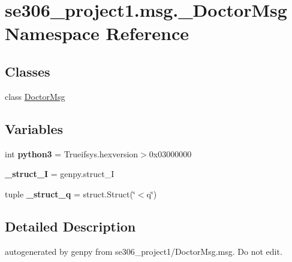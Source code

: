 \hypertarget{namespacese306__project1_1_1msg_1_1__DoctorMsg}{\section{se306\-\_\-project1.\-msg.\-\_\-\-Doctor\-Msg Namespace Reference}
\label{namespacese306__project1_1_1msg_1_1__DoctorMsg}
}
\subsection*{Classes}
\begin{DoxyCompactItemize}
\item 
class \hyperlink{classse306__project1_1_1msg_1_1__DoctorMsg_1_1DoctorMsg}{Doctor\-Msg}
\end{DoxyCompactItemize}
\subsection*{Variables}
\begin{DoxyCompactItemize}
\item 
\hypertarget{namespacese306__project1_1_1msg_1_1__DoctorMsg_ab1490ff5734e2153fbc9f3ac4fbdd4fa}{int {\bfseries python3} = Trueifsys.\-hexversion$>$0x03000000}\label{namespacese306__project1_1_1msg_1_1__DoctorMsg_ab1490ff5734e2153fbc9f3ac4fbdd4fa}

\item 
\hypertarget{namespacese306__project1_1_1msg_1_1__DoctorMsg_a074550654ddac71c27f8ce10c00c240c}{{\bfseries \-\_\-struct\-\_\-\-I} = genpy.\-struct\-\_\-\-I}\label{namespacese306__project1_1_1msg_1_1__DoctorMsg_a074550654ddac71c27f8ce10c00c240c}

\item 
\hypertarget{namespacese306__project1_1_1msg_1_1__DoctorMsg_ab84c483c8bacf3fc5fc322c86b66a73d}{tuple {\bfseries \-\_\-struct\-\_\-q} = struct.\-Struct(\char`\"{}$<$q\char`\"{})}\label{namespacese306__project1_1_1msg_1_1__DoctorMsg_ab84c483c8bacf3fc5fc322c86b66a73d}

\end{DoxyCompactItemize}


\subsection{Detailed Description}
\begin{DoxyVerb}autogenerated by genpy from se306_project1/DoctorMsg.msg. Do not edit.\end{DoxyVerb}
 